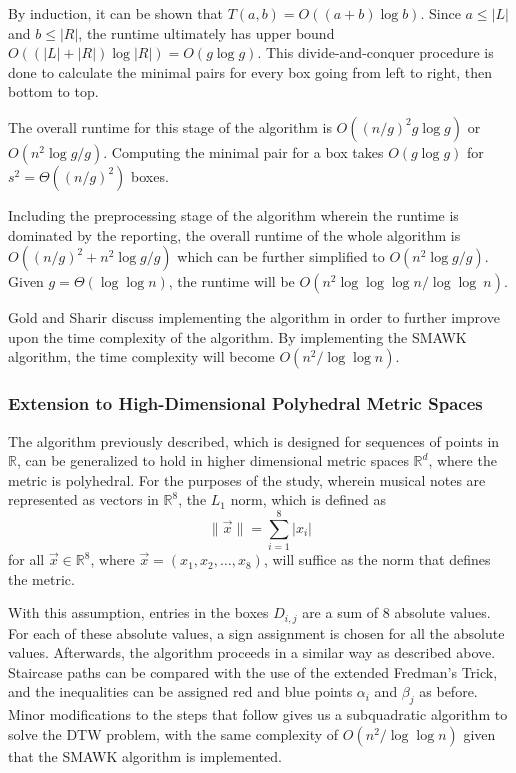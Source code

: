 By induction, it can be shown that $T(a,b)=O((a+b)\log{b})$. Since $a\le|L|$ and $b\le|R|$, the runtime ultimately has upper bound $O((|L|+|R|)\log|R|)=O(g\log{g})$. This divide-and-conquer procedure is done to calculate the minimal pairs for every box going from left to right, then bottom to top.

The overall runtime for this stage of the algorithm is $O((n/g)^2g\log g)$ or $O(n^2 \log{g}/g)$. Computing the minimal pair for a box takes $O(g\log{g})$ for $s^2 = \Theta((n/g)^2)$ boxes.

Including the preprocessing stage of the algorithm wherein the runtime is dominated by the reporting, the overall runtime of the whole algorithm is $O((n/g)^2+n^2\log{g}/g)$ which can be further simplified to $O(n^2\log{g}/g)$. Given $g=\Theta(\log\log n)$, the  runtime will be $O(n^2 \log \log \log{n}/ \log \log\ n)$.

Gold and Sharir discuss implementing the algorithm in order to further improve upon the time complexity of the algorithm. By implementing the SMAWK algorithm, the time complexity will become $O(n^2 /\log\log{n})$.

\subsubsection{Extension to High-Dimensional Polyhedral Metric Spaces}
The algorithm previously described, which is designed for sequences of points in $\mathbb{R}$, can be generalized to hold in higher dimensional metric spaces $\mathbb{R}^d$, where the metric is polyhedral. For the purposes of the study, wherein musical notes are represented as vectors in $\mathbb{R}^8$, the $L_1$ norm, which is defined as
\[
    \|\vec{x}\|=\sum_{i=1}^8 |x_i|
\]
for all $\vec{x}\in\mathbb{R}^8$, where $\vec{x}=(x_1,x_2,\dots,x_8)$, will suffice as the norm that defines the metric.

With this assumption, entries in the boxes $D_{i,j}$ are a sum of 8 absolute values. For each of these absolute values, a sign assignment is chosen for all the absolute values. Afterwards, the algorithm proceeds in a similar way as described above. Staircase paths can be compared with the use of the extended Fredman's Trick, and the inequalities can be assigned red and blue points $\alpha_i$ and $\beta_j$ as before. Minor modifications to the steps that follow gives us a subquadratic algorithm to solve the DTW problem, with the same complexity of $O(n^2/\log\log{n})$ given that the SMAWK algorithm is implemented.

